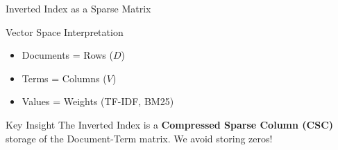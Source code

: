 \documentclass[aspectratio=169]{beamer}
\newif\ifanimated
\newcommand{\cpause}{\ifanimated\pause\fi}
\begin{document}
\begin{frame}[shrink=10]{Inverted Index as a Sparse Matrix}
\begin{block}{Vector Space Interpretation}
\begin{itemize}
    \item Documents = Rows ($D$)
    \item Terms = Columns ($V$)
    \item Values = Weights (TF-IDF, BM25)
\end{itemize}
\end{block}
\cpause

\begin{center}

\end{center}

\begin{exampleblock}{Key Insight}
The Inverted Index is a \textbf{Compressed Sparse Column (CSC)} storage of the Document-Term matrix. We avoid storing zeros!
\end{exampleblock}
\cpause
\end{frame}
\end{document}
